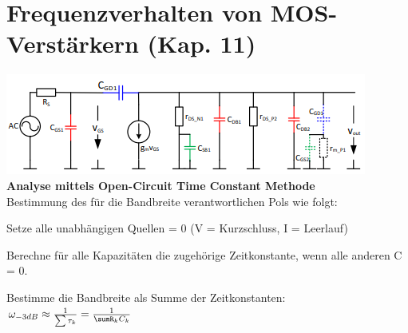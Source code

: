 
\section{Frequenzverhalten von MOS-Verstärkern (Kap. 11)}
\includegraphics[width=0.5\linewidth]{chapters/Frequenzverhalten/images/parasitaere_kapazitaeten}
\textbf{Analyse mittels Open-Circuit Time Constant Methode} \\
Bestimmung des für die Bandbreite verantwortlichen Pols wie folgt:
\begin{compactenum}
	\item Setze alle unabhängigen Quellen = 0 (V =\> Kurzschluss, I =\> Leerlauf)
	\item Berechne für alle Kapazitäten die zugehörige Zeitkonstante, wenn alle anderen C = 0.
	\item Bestimme die Bandbreite als Summe der Zeitkonstanten: $\omega_{-3dB}\approx \frac{1}{\sum\tau_k}=\frac{1}{\sumR_kC_k}$
\end{compactenum}

